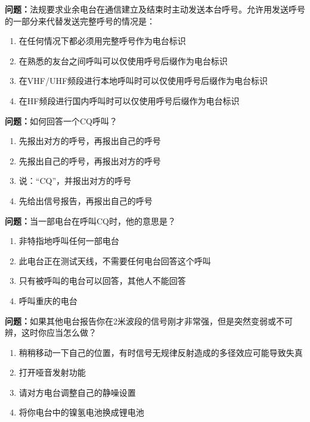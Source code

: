 \bigskip


\noindent\textbf{问题：}法规要求业余电台在通信建立及结束时主动发送本台呼号。允许用发送呼号的一部分来代替发送完整呼号的情况是：
\begin{enumerate}[label=\Alph*), leftmargin=3em]
\item 在任何情况下都必须用完整呼号作为电台标识
\item 在熟悉的友台之间呼叫可以仅使用呼号后缀作为电台标识
\item 在VHF/UHF频段进行本地呼叫时可以仅使用呼号后缀作为电台标识
\item 在HF频段进行国内呼叫时可以仅使用呼号后缀作为电台标识
\end{enumerate}

\bigskip


\noindent\textbf{问题：}如何回答一个CQ呼叫？
\begin{enumerate}[label=\Alph*), leftmargin=3em]
\item 先报出对方的呼号，再报出自己的呼号
\item 先报出自己的呼号，再报出对方的呼号
\item 说：“CQ”，并报出对方的呼号
\item 先给出信号报告，再报出自己的呼号
\end{enumerate}

\bigskip


\noindent\textbf{问题：}当一部电台在呼叫CQ时，他的意思是？
\begin{enumerate}[label=\Alph*), leftmargin=3em]
\item 非特指地呼叫任何一部电台
\item 此电台正在测试天线，不需要任何电台回答这个呼叫
\item 只有被呼叫的电台可以回答，其他人不能回答
\item 呼叫重庆的电台
\end{enumerate}

\bigskip


\noindent\textbf{问题：}如果其他电台报告你在2米波段的信号刚才非常强，但是突然变弱或不可辨，这时你应当怎么做？
\begin{enumerate}[label=\Alph*), leftmargin=3em]
\item 稍稍移动一下自己的位置，有时信号无规律反射造成的多径效应可能导致失真
\item 打开哑音发射功能
\item 请对方电台调整自己的静噪设置
\item 将你电台中的镍氢电池换成锂电池
\end{enumerate}

